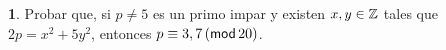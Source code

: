 \theoremstyle{definition}
\newtheorem{ejerLimitaciones}{\ejername}[section]


\begin{ejerLimitaciones}
	Probar que, si $p\neq 5$ es un primo impar y existen
	$x,y\in\Enteros$ tales que $2p=x^2+5y^2$, entonces
	$p\equiv 3,7\tmodulo[20]$.%
\end{ejerLimitaciones}

